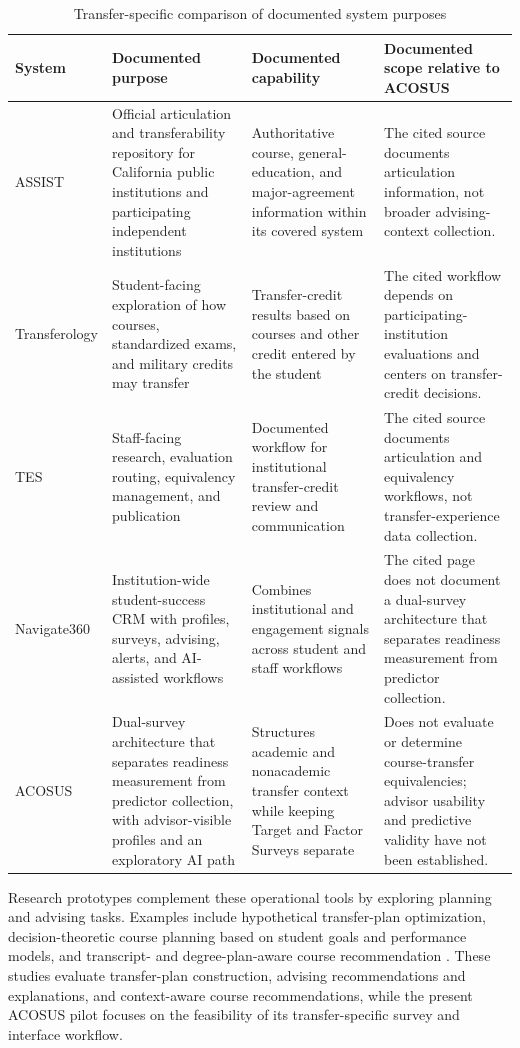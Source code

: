 \documentclass[letterpaper,11pt]{article}
\begin{document}
\begin{table}[htbp]
\caption{Transfer-specific comparison of documented system purposes}
\label{tab:comparison}
\centering
{\renewcommand{\arraystretch}{1.16}
\begin{tabular}{@{}p{2.6cm}p{4.0cm}p{4.0cm}p{4.5cm}@{}}
\toprule
\textbf{System} & \textbf{Documented purpose} & \textbf{Documented capability} & \textbf{Documented scope relative to ACOSUS} \\
\midrule
ASSIST & Official articulation and transferability repository for California public institutions and participating independent institutions & Authoritative course, general-education, and major-agreement information within its covered system & The cited source documents articulation information, not broader advising-context collection. \\
\addlinespace[3pt]
Transferology & Student-facing exploration of how courses, standardized exams, and military credits may transfer & Transfer-credit results based on courses and other credit entered by the student & The cited workflow depends on participating-institution evaluations and centers on transfer-credit decisions. \\
\addlinespace[3pt]
TES & Staff-facing research, evaluation routing, equivalency management, and publication & Documented workflow for institutional transfer-credit review and communication & The cited source documents articulation and equivalency workflows, not transfer-experience data collection. \\
\addlinespace[3pt]
Navigate360 & Institution-wide student-success CRM with profiles, surveys, advising, alerts, and AI-assisted workflows & Combines institutional and engagement signals across student and staff workflows & The cited page does not document a dual-survey architecture that separates readiness measurement from predictor collection. \\
\addlinespace[3pt]
ACOSUS & Dual-survey architecture that separates readiness measurement from predictor collection, with advisor-visible profiles and an exploratory AI path & Structures academic and nonacademic transfer context while keeping Target and Factor Surveys separate & Does not evaluate or determine course-transfer equivalencies; advisor usability and predictive validity have not been established. \\
\bottomrule
\end{tabular}
}
\end{table}

Research prototypes complement these operational tools by exploring planning and advising tasks. Examples include hypothetical transfer-plan optimization, decision-theoretic course planning based on student goals and performance models, and transcript- and degree-plan-aware course recommendation \parencites[pp.~3, 5, 12, 19]{nguyen2024optimal}[pp.~1, 4]{mattei2014advising}[pp.~1, 4--6]{mi2025smartcourse}. These studies evaluate transfer-plan construction, advising recommendations and explanations, and context-aware course recommendations, while the present ACOSUS pilot focuses on the feasibility of its transfer-specific survey and interface workflow.
\end{document}
